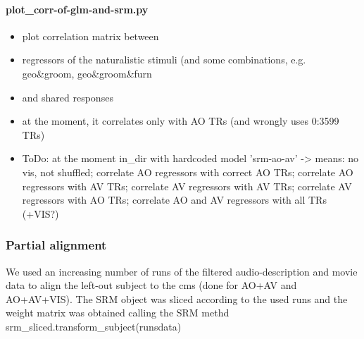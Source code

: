 \paragraph{plot\_corr-of-glm-and-srm.py}
%
\begin{itemize}
    \item plot correlation matrix between
    \item regressors of the naturalistic stimuli (and some combinations, e.g.
        geo\&groom, geo\&groom\&furn
    \item and shared responses
    \item at the moment, it correlates only with AO TRs (and wrongly uses
        0:3599 TRs)
    \item ToDo: at the moment in\_dir with hardcoded model 'srm-ao-av'
    ->  means: no vis, not shuffled; correlate AO regressors with correct AO
        TRs; correlate AO regressors with AV TRs; correlate AV regressors with
        AV TRs; correlate AV regressors with AO TRs; correlate AO and AV
        regressors with all TRs (+VIS?)
\end{itemize}


\subsubsection{Partial alignment}

We used an increasing number of runs of the filtered audio-description and movie
data to align the left-out subject to the \ac{cms} (done for AO+AV and AO+AV+VIS).
%
The SRM object was sliced according to the used runs and the weight matrix was
obtained calling the SRM methd srm\_sliced.transform\_subject(runsdata)


